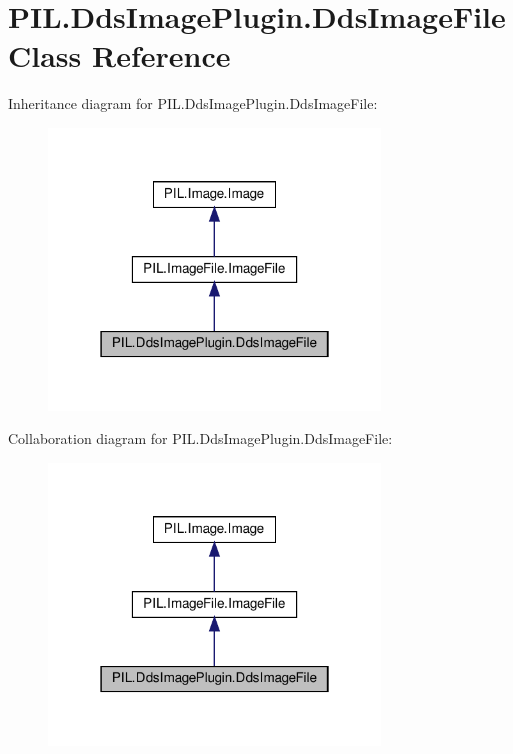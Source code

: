 \hypertarget{classPIL_1_1DdsImagePlugin_1_1DdsImageFile}{}\section{P\+I\+L.\+Dds\+Image\+Plugin.\+Dds\+Image\+File Class Reference}
\label{classPIL_1_1DdsImagePlugin_1_1DdsImageFile}


Inheritance diagram for P\+I\+L.\+Dds\+Image\+Plugin.\+Dds\+Image\+File\+:
\nopagebreak
\begin{figure}[H]
\begin{center}
\leavevmode
\includegraphics[width=250pt]{classPIL_1_1DdsImagePlugin_1_1DdsImageFile__inherit__graph}
\end{center}
\end{figure}


Collaboration diagram for P\+I\+L.\+Dds\+Image\+Plugin.\+Dds\+Image\+File\+:
\nopagebreak
\begin{figure}[H]
\begin{center}
\leavevmode
\includegraphics[width=250pt]{classPIL_1_1DdsImagePlugin_1_1DdsImageFile__coll__graph}
\end{center}
\end{figure}
